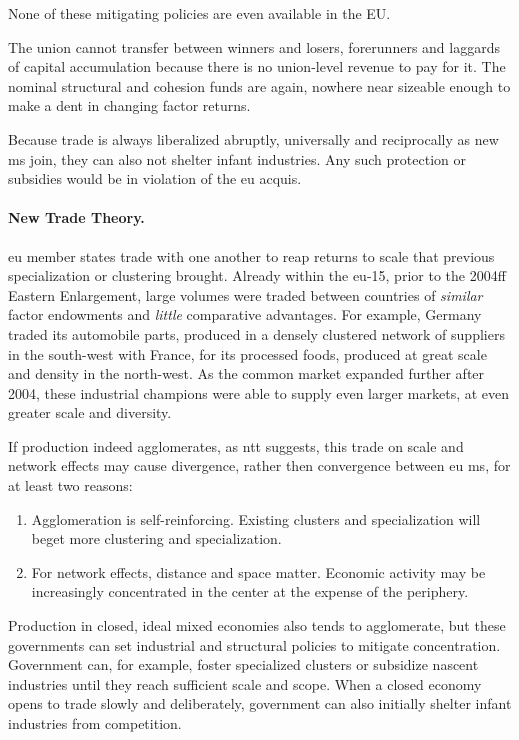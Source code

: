 None of these mitigating policies are even available in the EU.

The union cannot transfer between winners and losers, forerunners and laggards of capital accumulation because there is no union-level revenue to pay for it.
The nominal structural and cohesion funds are again, nowhere near sizeable enough to make a dent in changing factor returns.

Because trade is always liberalized abruptly, universally and reciprocally as new \gls{ms} join, they can also not shelter infant industries.
Any such protection or subsidies would be in violation of the \gls{eu} acquis.

\paragraph{New Trade Theory.}
\gls{eu} member states trade with one another to reap returns to scale that previous specialization or clustering brought.
Already within the \gls{eu}-15, prior to the 2004ff Eastern Enlargement, large volumes were traded between countries of \emph{similar} factor endowments and \emph{little} comparative advantages.
For example, Germany traded its automobile parts, produced in a densely clustered network of suppliers in the south-west with France, for its processed foods, produced at great scale and density in the north-west.
As the common market expanded further after 2004, these industrial champions were able to supply even larger markets, at even greater scale and diversity.

If production indeed agglomerates, as \gls{ntt} suggests, this trade on scale and network effects may cause divergence, rather then convergence between \gls{eu} \gls{ms}, for at least two reasons:
\begin{enumerate}
	\item Agglomeration is self-reinforcing.
	Existing clusters and specialization will beget more clustering and specialization.
	\item For network effects, distance and space matter.
	Economic activity may be increasingly concentrated in the center at the expense of the periphery.
\end{enumerate}

Production in closed, ideal mixed economies also tends to agglomerate, but these governments can set industrial and structural policies to mitigate concentration.
Government can, for example, foster specialized clusters or subsidize nascent industries until they reach sufficient scale and scope.
When a closed economy opens to trade slowly and deliberately, government can also initially shelter infant industries from competition.

